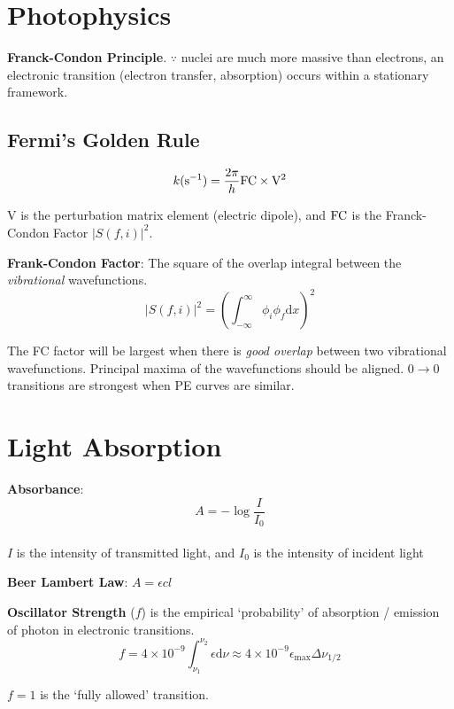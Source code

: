 \section{Photophysics}
\textbf{Franck-Condon Principle}. $\because$ nuclei are much more massive than electrons,
an electronic transition (electron transfer, absorption) occurs within a stationary framework.

\subsection*{Fermi's Golden Rule}
$$k(\mathrm{s}^{-1}) = \frac{2\pi}{h}\ce{FC} \times \mathrm{V}^2$$

$\mathrm{V}$ is the perturbation matrix element (electric dipole), and $\ce{FC}$ is the Franck-Condon Factor $|S(f,i)|^2$.
\vspace{\baselineskip}

\textbf{Frank-Condon Factor}: The square of the overlap integral between the \textit{vibrational} wavefunctions.
$$|S(f,i)|^2 = \left( \int^{\infty}_{-\infty}\phi_i\phi_f \mathrm{d}x \right)^2$$

The FC factor will be largest when there is \textit{good overlap} between two vibrational wavefunctions. Principal maxima of
the wavefunctions should be aligned. $0 \rightarrow 0$ transitions are strongest when PE curves are similar.
\vspace{\baselineskip}

\section{Light Absorption}
\textbf{Absorbance}: $$ A = -\log \frac{I}{I_0}$$ \\
$I$ is the intensity of transmitted light, and $I_0$ is the intensity of incident light

\vspace{\baselineskip}

\textbf{Beer Lambert Law}: $A = \epsilon cl$
\vspace{\baselineskip}

\textbf{Oscillator Strength} ($f$) is the empirical `probability' of absorption / emission of photon in electronic transitions.
\begin{equation*}
  f = 4 \times 10^{-9} \int_{\nu_1}^{\nu_2}\epsilon \mathrm{d}\nu \approx 4 \times 10^{-9} \epsilon_{\mathrm{max}} \Delta \nu_{1/2}
\end{equation*}

$f = 1$ is the `fully allowed' transition.

